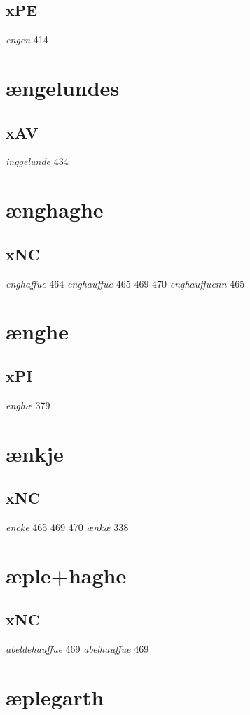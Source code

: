 \documentclass[a4paper,twocolumn]{article}
\begin{document}
\subsection{xPE}
\label{sec:orgae42f7a}
\emph{engen} 414 
\section{ængelundes}
\label{sec:org176329a}
\subsection{xAV}
\label{sec:org4d7e422}
\emph{inggelunde} 434 
\section{ænghaghe}
\label{sec:org3c357f0}
\subsection{xNC}
\label{sec:orgb57fdd5}
\emph{enghaffue} 464 \emph{enghauffue} 465 469 470 \emph{enghauffuenn} 465 
\section{ænghe}
\label{sec:org28b7f98}
\subsection{xPI}
\label{sec:orgeaccd62}
\emph{enghæ} 379 
\section{ænkje}
\label{sec:orgd067eda}
\subsection{xNC}
\label{sec:org3eb407a}
\emph{encke} 465 469 470 \emph{ænkæ} 338 
\section{æple+haghe}
\label{sec:orgd57672e}
\subsection{xNC}
\label{sec:org9ff0e74}
\emph{abeldehauffue} 469 \emph{abelhauffue} 469 
\section{æplegarth}
\label{sec:org1b58a75}
\end{document}
